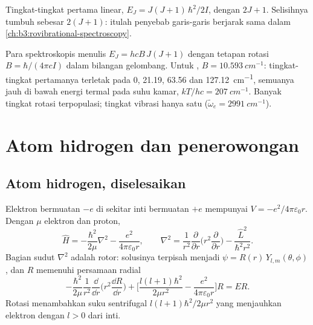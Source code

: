 \begin{omfigure}

{\small Tingkat-tingkat pertama  linear, $E_J = J(J+1)\,\hbar^2/2I$,
dengan  $2J + 1$. Selisihnya tumbuh sebesar $2(J+1)$: itulah
penyebab garis-garis berjarak sama dalam \cref{ch:b3:rovibrational-spectroscopy}.}
\end{omfigure}

\begin{example}\label{ex:b3:quantum-model-systems:hcl}
Para spektroskopis menulis $E_J = hcB\,J(J+1)$ dengan tetapan rotasi $B =
\hbar/(4\pi cI)$ dalam bilangan gelombang. Untuk , $B = \qty{10.593}{cm^{-1}}$:
tingkat-tingkat pertamanya terletak pada 0, 21.19, 63.56 dan
\qty{127.12}{cm^{-1}}, semuanya jauh di bawah energi termal pada suhu kamar,
$kT/hc = \qty{207}{cm^{-1}}$. Banyak tingkat rotasi terpopulasi; tingkat
vibrasi hanya satu ($\tilde\omega_e = \qty{2991}{cm^{-1}}$).
\end{example}

\section{Atom hidrogen dan penerowongan}

\subsection*{Atom hidrogen, diselesaikan}

Elektron bermuatan $-e$ di sekitar inti bermuatan $+e$ mempunyai $V = -e^2/
4\pi\varepsilon_0r$. Dengan  $\mu$ elektron dan proton,
\[
\hat H = -\frac{\hbar^2}{2\mu}\nabla^2 - \frac{e^2}{4\pi\varepsilon_0r},\qquad
\nabla^2 = \frac{1}{r^2}\frac{\partial}{\partial r}\Big(r^2\frac{\partial}{
\partial r}\Big) - \frac{\hat L^2}{\hbar^2r^2}.
\]
Bagian sudut $\nabla^2$ adalah  rotor: solusinya terpisah menjadi
$\psi = R(r)\,Y_{l,m}(\theta,\phi)$, dan $R$ memenuhi persamaan radial
\[
-\frac{\hbar^2}{2\mu}\frac{1}{r^2}\frac{\dd}{\dd r}\Big(r^2\frac{\dd R}{\dd r}
\Big) + \Big[\frac{l(l+1)\hbar^2}{2\mu r^2} - \frac{e^2}{4\pi\varepsilon_0r}
\Big]R = ER.
\]
Rotasi menambahkan suku sentrifugal $l(l+1)\hbar^2/2\mu r^2$ yang menjauhkan
elektron dengan $l > 0$ dari inti.

